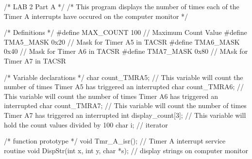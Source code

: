 /* LAB 2 Part A */
/* This program displays the number of times each of the Timer A interrupts have occured on the computer monitor */

/* Definitions */
#define MAX_COUNT   100     // Maximum Count Value
#define TMA5_MASK   0x20    // Mask for Timer A5 in TACSR
#define TMA6_MASK   0x40    // Mask for Timer A6 in TACSR
#define TMA7_MASK   0x80    // MAsk for Timer A7 in TACSR

/* Variable declarations */
char count_TMRA5;                                          // This variable will count the number of times Timer A5 has triggered an interrupted
char count_TMRA6;                                          // This variable will count the number of times Timer A6 has triggered an interrupted
char count_TMRA7;                                          // This variable will count the number of times Timer A7 has triggered an interrupted
int display_count[3];                                    // This variable will hold the count values divided by 100
char i;                                                   // iterator

/* function prototype */
void Tmr_A_isr();                                        // Timer A interrupt service routine
void DispStr(int x, int y, char *s);                     // display strings on computer monitor


